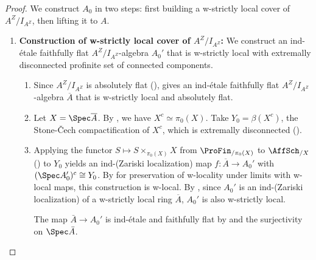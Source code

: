 \begin{proof}
    
    We construct $A_0$ in two steps: first building a w-strictly local cover of $A^Z/I_{A^Z}$, then lifting it to $A$.

    \begin{enumerate}
        \item \textbf{Construction of w-strictly local cover of $A^Z/I_{A^Z}$:} 
        We construct an ind-étale faithfully flat $A^Z/I_{A^Z}$-algebra $A_0'$ that is w-strictly local with extremally disconnected profinite set of connected components.

        \begin{enumerate}
            \item Since $A^Z/I_{A^Z}$ is absolutely flat (),  gives an ind-étale faithfully flat $A^Z/I_{A^Z}$-algebra $\overline{A}$ that is w-strictly local and absolutely flat.

            \item Let $X = \Spec \overline{A}$. By , we have $X^c \simeq \pi_0(X)$. Take $Y_0 = \beta(X^c)$, the Stone-Čech compactification of $X^c$, which is extremally disconnected ().

            \item Applying the functor $S \mapsto S \times_{\pi_0(X)} X$ from $\ProFin_{/\pi_0(X)}$ to $\AffSch_{/X}$ () to $Y_0$ yields an ind-(Zariski localization) map $f: \overline{A} \to A_0'$ with $(\Spec A_0')^c \cong Y_0$. By  for preservation of w-locality under limits with w-local maps, this construction is w-local. By , since $A_0'$ is an ind-(Zariski localization) of a w-strictly local ring $\overline{A}$, $A_0'$ is also w-strictly local.

            The map \(\bar{A} \to A_0'\) is ind-étale and faithfully flat by  and the surjectivity on \(\Spec \bar{A}\).


\end{enumerate}
\end{enumerate}
\end{proof}
